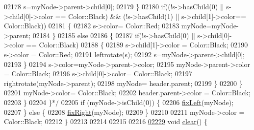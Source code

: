 \begin{DoxyCode}
02178 \textcolor{comment}{                         s=myNode->parent->child[0];}
02179 \textcolor{comment}{                     \}}
02180 \textcolor{comment}{                     if((!s->hasChild(0) || s->child[0]->color == Color::Black) && (!s->hasChild(1) ||
       s->child[1]->color== Color::Black))}
02181 \textcolor{comment}{                     \{}
02182 \textcolor{comment}{                         s->color= Color::Red;}
02183 \textcolor{comment}{                         myNode=myNode->parent;}
02184 \textcolor{comment}{                     \}}
02185 \textcolor{comment}{                     else}
02186 \textcolor{comment}{                     \{}
02187 \textcolor{comment}{                         if(!s->hasChild(0) || s->child[0]->color == Color::Black)}
02188 \textcolor{comment}{                         \{}
02189 \textcolor{comment}{                             s->child[1]->color = Color::Black;}
02190 \textcolor{comment}{                             s->color = Color::Red;}
02191 \textcolor{comment}{                             leftrotate(s);}
02192 \textcolor{comment}{                             s=myNode->parent->child[0];}
02193 \textcolor{comment}{                         \}}
02194 \textcolor{comment}{                         s->color=myNode->parent->color;}
02195 \textcolor{comment}{                         myNode->parent->color = Color::Black;}
02196 \textcolor{comment}{                         s->child[0]->color= Color::Black;}
02197 \textcolor{comment}{                         rightrotate(myNode->parent);}
02198 \textcolor{comment}{                         myNode= header.parent;}
02199 \textcolor{comment}{                     \}}
02200 \textcolor{comment}{                 \}}
02201 \textcolor{comment}{                 myNode->color= Color::Black;}
02202 \textcolor{comment}{                 header.parent->color = Color::Black;}
02203 \textcolor{comment}{             \}}
02204 \textcolor{comment}{         \}*/}
02205             \textcolor{keywordflow}{if} (myNode->isChild(0)) \{
02206                 \hyperlink{classaed2_1_1map_ae69c26a9d27f538124cd827646e56feb_ae69c26a9d27f538124cd827646e56feb}{fixLeft}(myNode);
02207             \} \textcolor{keywordflow}{else} \{
02208                 \hyperlink{classaed2_1_1map_ae908761d06411046290cf49a5e0618bd_ae908761d06411046290cf49a5e0618bd}{fixRight}(myNode);
02209             \}
02210 
02211             myNode->color = Color::Black;
02212         \}
02213 
02214 
02215 
02216 
\hypertarget{map_8h_source.tex_l02229}{}\hyperlink{classaed2_1_1map_a2bfa5165825979bf2431db55bc6bc9ca_a2bfa5165825979bf2431db55bc6bc9ca}{02229}         \textcolor{keywordtype}{void} \hyperlink{classaed2_1_1map_a2bfa5165825979bf2431db55bc6bc9ca_a2bfa5165825979bf2431db55bc6bc9ca}{clear}() \{

\end{DoxyCode}
